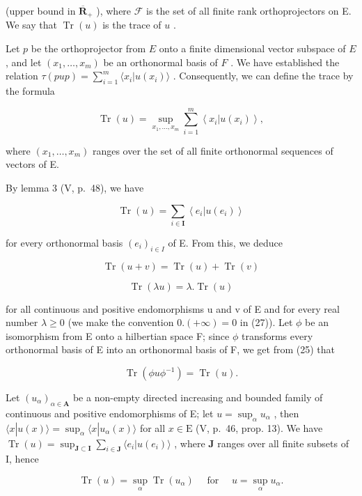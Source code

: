 (upper bound in \(\overline{\mathbf{R}}_+\) ), where \(\mathcal{F}\) is the set of all finite rank orthoprojectors on E. We say that \(\operatorname{Tr}(u)\) is the trace of \(u\) .

Let \(p\) be the orthoprojector from \(E\) onto a finite dimensional vector subspace of \(E\) , and let \((x_1, \ldots, x_m)\) be an orthonormal basis of \(F\) . We have established the relation \(\tau(pup) = \sum_{i=1}^{m} \langle x_i | u(x_i) \rangle\) . Consequently, we can define the trace by the formula

\[
\operatorname{Tr} (u) = \sup _ {x _ {1}, \dots , x _ {m}} \sum_ {i = 1} ^ {m} \left\langle x _ {i} | u (x _ {i}) \right\rangle ,\tag{24'}
\]

where \((x_{1},\dots,x_{m})\) ranges over the set of all finite orthonormal sequences of vectors of E.

By lemma 3 (V, p.~48), we have

\[
\operatorname{Tr} (u) = \sum_ {i \in \mathbf {I}} \left\langle e _ {i} | u (e _ {i}) \right\rangle\tag{25}
\]

for every orthonormal basis \((e_{i})_{i\in I}\) of E. From this, we deduce

\[
\operatorname{Tr} (u + v) = \operatorname{Tr} (u) + \operatorname{Tr} (v)\tag{26}
\]

\[
\operatorname{Tr} (\lambda u) = \lambda . \operatorname{Tr} (u)\tag{27}
\]

for all continuous and positive endomorphisms u and v of E and for every real number \(\lambda \geqslant 0\) (we make the convention \(0. (+\infty) = 0\) in (27)). Let \(\phi\) be an isomorphism from E onto a hilbertian space F; since \(\phi\) transforms every orthonormal basis of E into an orthonormal basis of F, we get from (25) that

\[
\operatorname{Tr} \left(\phi u \phi^ {- 1}\right) = \operatorname{Tr} (u).\tag{28}
\]

Let \((u_{\alpha})_{\alpha \in \mathbf{A}}\) be a non-empty directed increasing and bounded family of continuous and positive endomorphisms of E; let \(u = \sup_{\alpha} u_{\alpha}\) , then \(\langle x|u(x) \rangle = \sup_{\alpha} \langle x|u_{\alpha}(x) \rangle\) for all \(x \in \mathrm{E}\) (V, p.~46, prop. 13). We have \(\operatorname{Tr}(u) = \sup_{\mathbf{J} \subset \mathbf{I}} \sum_{i \in \mathbf{J}} \langle e_i | u(e_i) \rangle\) , where \(\mathbf{J}\) ranges over all finite subsets of I, hence

\[
\operatorname{Tr} (u) = \sup _ {\alpha} \operatorname{Tr} (u _ {\alpha}) \quad \text { for } \quad u = \sup _ {\alpha} u _ {\alpha}.\tag{29}
\]

